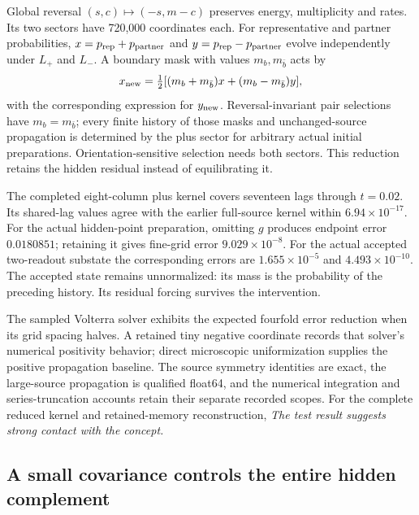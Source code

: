 Global reversal \((s,c)\mapsto(-s,m-c)\) preserves energy, multiplicity
and rates. Its two sectors have 720,000 coordinates each. For representative
and partner probabilities, \(x=p_{\rm rep}+p_{\rm partner}\) and
\(y=p_{\rm rep}-p_{\rm partner}\) evolve independently under \(L_+\)
and \(L_-\). A boundary mask with values \(m_b,m_{\bar b}\) acts by
\[
 x_{\rm new}=\tfrac12[(m_b+m_{\bar b})x+(m_b-m_{\bar b})y],
\]
with the corresponding expression for \(y_{\rm new}\).
Reversal-invariant pair selections have \(m_b=m_{\bar b}\); every finite
history of those masks and unchanged-source propagation is determined
by the plus sector for arbitrary actual initial preparations.
Orientation-sensitive selection needs both sectors. This reduction
retains the hidden residual instead of equilibrating it.

The completed eight-column plus kernel covers seventeen lags through
\(t=0.02\). Its shared-lag values agree with the earlier full-source
kernel within \(6.94\times10^{-17}\). For the actual hidden-point
preparation, omitting \(g\) produces endpoint error \(0.0180851\);
retaining it gives fine-grid error \(9.029\times10^{-8}\).
For the actual accepted two-readout substate the corresponding errors
are \(1.655\times10^{-5}\) and \(4.493\times10^{-10}\).
The accepted state remains unnormalized: its mass is the probability of
the preceding history. Its residual forcing survives the intervention.

The sampled Volterra solver exhibits the expected fourfold error
reduction when its grid spacing halves. A retained tiny negative
coordinate records that solver's numerical positivity behavior;
direct microscopic uniformization supplies the positive propagation
baseline. The source symmetry identities are exact, the large-source
propagation is qualified float64, and the numerical integration and
series-truncation accounts retain their separate recorded scopes.
For the complete reduced kernel and retained-memory reconstruction,
\emph{The test result suggests strong contact with the concept.}

\subsection{A small covariance controls the entire hidden complement}

